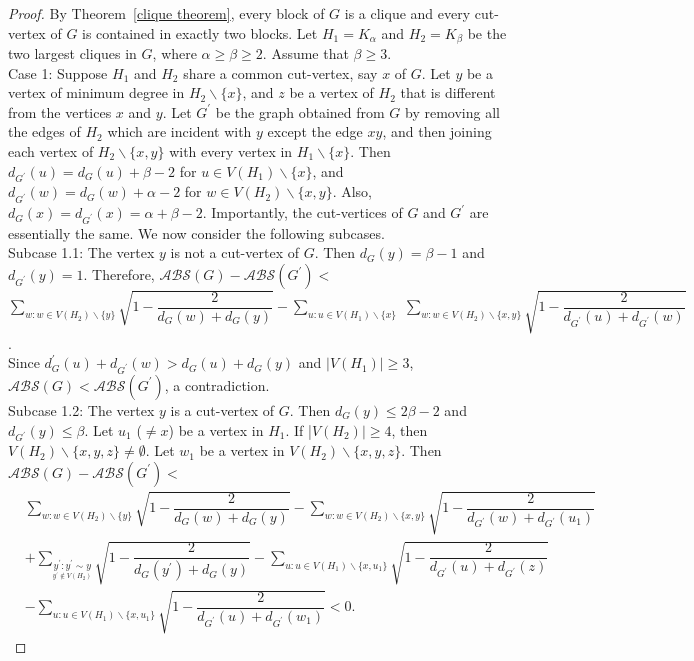 \documentclass[12pt]{article}
\begin{document}
\begin{proof}
By Theorem~\ref{clique theorem}, every block of $G$ is a clique and every cut-vertex of $G$ is contained in exactly two blocks.
Let $H_{1}=K_{\alpha}$ and $H_{2}=K_{\beta}$ be the two largest cliques in $G$, where $\alpha \ge \beta \ge 2$. Assume that $\beta\ge 3$.\\[2mm]
Case 1: Suppose $H_{1}$ and $H_{2}$ share a common cut-vertex, say $x$ of $G$.   
Let $y$ be a vertex of minimum degree in $H_{2}\backslash \{x\}$, and $z$ be a vertex of $H_{2}$ that is different from the vertices $x$  and $y$. Let $G^{\prime}$ be the graph obtained from $G$ by removing all the edges of $H_{2}$ which are incident with $y$ except the edge $xy$, and then joining each vertex of $H_{2}\backslash \{x,y\}$ with every vertex in $H_{1}\backslash \{x\}$. Then $d_{G^{\prime}}(u)= d_{G}(u)+\beta-2$ for $u\in V(H_{1})\backslash\{x\}$, and $d_{G^{\prime}}(w)=d_{G}(w)+\alpha-2$ for $w\in V(H_{2})\backslash\{x,y\}$. Also, $d_{G}(x)=d_{G^{\prime}}(x)=\alpha+\beta-2$. Importantly, the cut-vertices of $G$ and $G^{\prime}$ are essentially the same. We now consider the following subcases.\\[2mm]
Subcase 1.1: The vertex $y$ is not a cut-vertex of $G$. Then $d_{G}(y)=\beta-1$ and $d_{G^{\prime}}(y)=1$. Therefore,    
$\mathcal{ABS}(G)-\mathcal{ABS}(G^{\prime})<$\\[2mm]$\displaystyle\sum_{w: w\in V(H_{2})\backslash \{y\}}\sqrt{1-\dfrac{2}{d_{G}(w)+d_{G}(y)}}-\sum_{u:u\in V(H_{1})\backslash\{x\}}\,\,\sum_{w: w\in V(H_{2})\backslash\{x,y\}}\sqrt{1-\dfrac{2}{d_{G^{\prime}}(u)+d_{G^{\prime}}(w)}}$.\\[2mm]
Since $d_{G}^{\prime}(u)+d_{G^{\prime}}(w)> d_{G}(u)+d_{G}(y)$  and $|V(H_{1})|\ge 3$, $\mathcal{ABS}(G)<\mathcal{ABS}(G^{\prime})$, a contradiction.\\[2mm]
Subcase 1.2: The vertex $y$ is a cut-vertex of $G$. Then $d_{G}(y)\le 2\beta-2$ and $d_{G^{\prime}}(y)\le\beta$. Let $u_{1}$ ($\neq x$) be a vertex in $H_{1}$. If |$V(H_{2})|\ge 4$, then $V(H_{2})\backslash\{x,y,z\}\neq\emptyset$. Let $w_{1}$ be a vertex in $V(H_{2})\backslash\{x,y,z\}$. Then $\mathcal{ABS}(G)-\mathcal{ABS}(G^{\prime})<$
\begin{align*}&\displaystyle\sum_{w: w\in V(H_{2})\backslash \{y\}}\sqrt{1-\dfrac{2}{d_{G}(w)+d_{G}(y)}}
-\sum_{w: w\in V(H_{2})\backslash\{x,y\}}\sqrt{1-\dfrac{2}{d_{G^{\prime}}(w)+d_{G^{\prime}}(u_{1})}}\\[2mm]&+\sum_{\underset{ y^{\prime}\notin  V(H_{2})}{y^{\prime}: y^{\prime}\sim y} }\sqrt{1-\dfrac{2}{d_{G}(y^{\prime})+d_{G}(y)}}-\sum_{u: u\in V(H_{1})\backslash\{x,u_{1}\}}\sqrt{1-\dfrac{2}{d_{G^{\prime}}(u)+d_{G^{\prime}}(z)}}\\[2mm]&-\sum_{u: u\in V(H_{1})\backslash\{x,u_{1}\}}\sqrt{1-\dfrac{2}{d_{G^{\prime}}(u)+d_{G^{\prime}}(w_{1})}}<0.\end{align*}

\end{proof}
\end{document}
